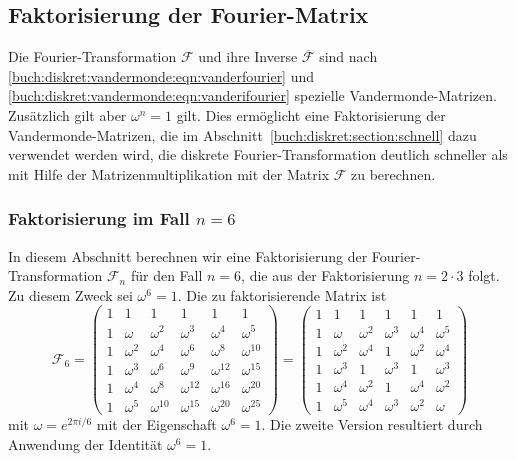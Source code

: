 %
%

%
%
%
\subsection{Faktorisierung der Fourier-Matrix
\label{buch:diskret:subsetion:faktorisierung}}
Die Fourier-Transformation $\mathscr{F}$ und ihre Inverse
$\overline{\mathscr{F}}$ sind nach
\eqref{buch:diskret:vandermonde:eqn:vanderfourier}
und
\eqref{buch:diskret:vandermonde:eqn:vanderifourier}
spezielle Van\-der\-mon\-de-Matrizen.
Zusätzlich gilt aber $\omega^n=1$ gilt.
Dies ermöglicht eine Faktorisierung der Vandermonde-Matrizen, die
im Abschnitt~\ref{buch:diskret:section:schnell} dazu verwendet
werden wird, die diskrete Fourier-Transformation deutlich schneller
als mit Hilfe der Matrizenmultiplikation mit der Matrix $\mathscr{F}$
zu berechnen.

%
%
\subsubsection{Faktorisierung im Fall $n=6$}
In diesem Abschnitt berechnen wir eine Faktorisierung der
Fourier-Transformation $\mathscr{F}_n$ für den Fall $n=6$,
die aus der Faktorisierung $n=2\cdot 3$ folgt.
Zu diesem Zweck sei $\omega^6=1$.
Die zu faktorisierende Matrix ist
\[
\mathscr{F}_6
=
\begin{pmatrix}
1&       1&          1&          1&          1&          1\\
1&  \omega&   \omega^2&   \omega^3&   \omega^4&   \omega^5\\
1&\omega^2&   \omega^4&   \omega^6&   \omega^8&\omega^{10}\\
1&\omega^3&   \omega^6&   \omega^9&\omega^{12}&\omega^{15}\\
1&\omega^4&   \omega^8&\omega^{12}&\omega^{16}&\omega^{20}\\
1&\omega^5&\omega^{10}&\omega^{15}&\omega^{20}&\omega^{25}
\end{pmatrix}
=
\begin{pmatrix}
1&       1&       1&       1&       1&       1\\
1&  \omega&\omega^2&\omega^3&\omega^4&\omega^5\\
1&\omega^2&\omega^4&       1&\omega^2&\omega^4\\
1&\omega^3&       1&\omega^3&       1&\omega^3\\
1&\omega^4&\omega^2&       1&\omega^4&\omega^2\\
1&\omega^5&\omega^4&\omega^3&\omega^2&\omega
\end{pmatrix}
\]
mit $\omega = e^{2\pi i/6}$ mit der Eigenschaft $\omega^6=1$.
Die zweite Version resultiert durch Anwendung der Identität $\omega^6=1$.

